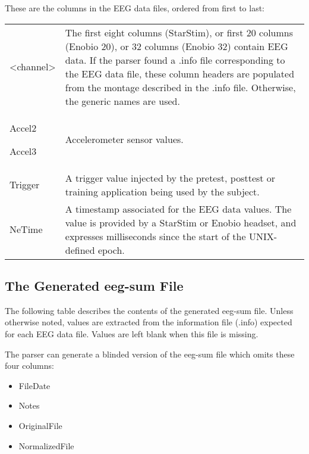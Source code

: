 \documentclass[letterpaper,10pt,english]{sphinxmanual}
\begin{document}
These are the columns in the EEG data files, ordered from first to last:


\begin{savenotes}\sphinxattablestart
\centering
\begin{tabulary}{\linewidth}[t]{|T|T|}
\hline
{}\relax &\relax \\
\hline
\textless{}channel\textgreater{}
&
The first eight columns (StarStim), or first 20 columns (Enobio 20), or 32 columns (Enobio 32) contain EEG data. If the parser found a .info file corresponding to the EEG data file, these column headers are populated from the montage described in the .info file. Otherwise, the generic names  are used.
\\

Accel2

Accel3
&
Accelerometer sensor values.
\\
\hline
Trigger
&
A trigger value injected by the pretest, posttest or training application being used by the subject.
\\
\hline
NeTime
&
A timestamp associated for the EEG data values. The value is provided by a StarStim or Enobio headset, and expresses milliseconds since the start of the UNIX-defined epoch.
\\
\hline
\end{tabulary}
\par
\sphinxattableend\end{savenotes}


\subsection{The Generated eeg-sum File}
\label{\detokenize{Data_Definations_Phase1B:the-generated-eeg-sum-file}}
The following table describes the contents of the generated eeg-sum
file. Unless otherwise noted, values are extracted from the information
file (.info) expected for each EEG data file. Values are left blank when
this file is missing.

The parser can generate a blinded version of the eeg-sum file which
omits these four columns:
\begin{itemize}
\item {} 
FileDate

\item {} 
Notes

\item {} 
OriginalFile

\item {} 
NormalizedFile

\end{itemize}
\end{document}
